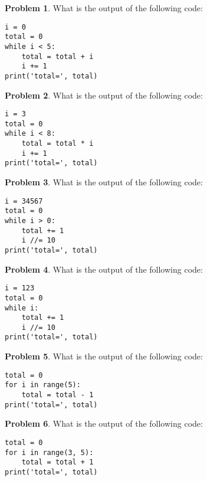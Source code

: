 \documentclass[10pt]{article}
\theoremstyle{definition}
\newtheorem{problem}{Problem}
\begin{document}
\begin{problem}
    What is the output of the following code:
\end{problem}
\begin{lstlisting}
i = 0
total = 0
while i < 5:
    total = total + i
    i += 1
print('total=', total)
\end{lstlisting}
\vspace{1.8in}


\begin{problem}
    What is the output of the following code:
\end{problem}
\begin{lstlisting}
i = 3
total = 0
while i < 8:
    total = total * i
    i += 1
print('total=', total)
\end{lstlisting}
\vspace{1.8in}


\begin{problem}
    What is the output of the following code:
\end{problem}
\begin{lstlisting}
i = 34567
total = 0
while i > 0:
    total += 1
    i //= 10
print('total=', total)
\end{lstlisting}
\vspace{1.8in}


\begin{problem}
    What is the output of the following code:
\end{problem}
\begin{lstlisting}
i = 123
total = 0
while i:
    total += 1
    i //= 10
print('total=', total)
\end{lstlisting}
\vspace{1.8in}


\begin{problem}
    What is the output of the following code:
\end{problem}
\begin{lstlisting}
total = 0
for i in range(5):
    total = total - 1
print('total=', total)
\end{lstlisting}
\vspace{2in}

\begin{problem}
    What is the output of the following code:
\end{problem}
\begin{lstlisting}
total = 0
for i in range(3, 5):
    total = total + 1
print('total=', total)
\end{lstlisting}
\vspace{2in}
\end{document}
